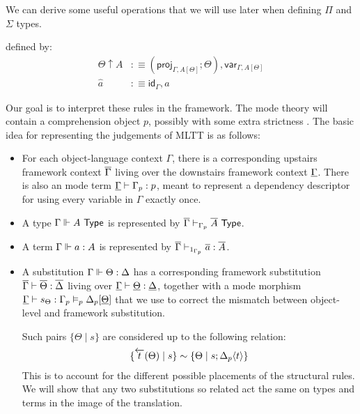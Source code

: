 \documentclass[10pt]{article}
\theoremstyle{definition}
\newcommand{\yields}{\vdash}
\newcommand{\TYPE}{\,\,\mathsf{Type}}
\newcommand{\rewrite}[2]{\overleftarrow{#1}(#2)}
\newcommand\proj[1]{\ensuremath{\mathsf{proj}_{#1}}}
\newcommand\var[1]{\ensuremath{\mathsf{var}_{#1}}}
\newcommand{\id}{\mathsf{id}}
\newcommand\ap[2]{\ensuremath{#1 \langle #2 \rangle }}
\begin{document}
We can derive some useful operations that we will use later when defining $\Pi$ and $\Sigma$ types.
defined by:
\begin{align*}
\Theta \uparrow A &:\equiv (\proj{\Gamma, A[\Theta]}; \Theta) , \var{\Gamma, A[\Theta]} \\
\hat{a} &:\equiv \id_{\Gamma} , a
\end{align*}

Our goal is to interpret these rules in the framework. The mode theory will contain a comprehension object $p$, possibly with some extra strictness . The basic idea for representing the judgements of MLTT is as follows:
\begin{itemize}
\item For each object-language context $\Gamma$, there is a corresponding upstairs framework context $\overline{\Gamma}$ living over the downstairs framework context $\underline{\Gamma}$. There is also an mode term $\downstairs{\Gamma} \yields \asdep{\Gamma} : p$, meant to represent a dependency descriptor for using every variable in $\Gamma$ exactly once.

\item A type $\Gamma \qyields A \TYPE$ is represented by $\upstairs{\Gamma} \yields_{\asdep{\Gamma}} \upstairs{A} \TYPE$.
  
\item A term $\Gamma \Vdash a : A$ is represented by $\upstairs{\Gamma} \yields_{1_{\asdep{\Gamma}}} \upstairs{a} : \upstairs{A}$.

\item A substitution $\Gamma \Vdash \Theta : \Delta$ has a corresponding framework substitution $\upstairs{\Gamma} \yields \upstairs{\Theta} : \upstairs{\Delta}$ living over $\downstairs{\Gamma} \yields \downstairs{\Theta} : \downstairs{\Delta}$, together with a mode morphism $\downstairs{\Gamma} \yields s_\Theta : \asdep{\Gamma} \vDash_p \asdep{\Delta}[\downstairs{\Theta}]$ that we use to correct the mismatch between object-level and framework substitution.

Such pairs $\{ \Theta \mid s \}$ are considered up to the following relation:
\begin{align*}
\{ \rewrite{t}{\Theta} \mid s \} \sim \{ \Theta \mid s ; \ap{\asdep{\Delta}}{t} \}
\end{align*}
This is to account for the different possible placements of the structural rules. We will show that any two substitutions so related act the same on types and terms in the image of the translation.
\end{itemize}
\end{document}
